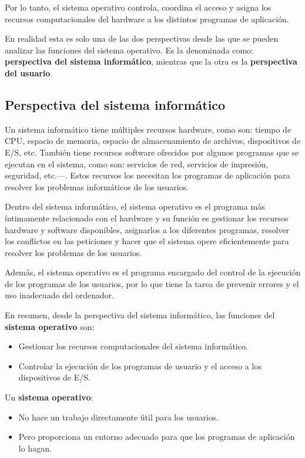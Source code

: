 Por lo tanto, el sistema operativo controla, coordina el acceso y asigna
los recursos computacionales del hardware a los distintos programas de
aplicación.

En realidad esta es solo una de las dos perspectivas desde las que se
pueden analizar las funciones del sistema operativo. Es la denominada
como: \textbf{perspectiva del sistema informático}, mientras que la otra
es la \textbf{perspectiva del usuario}.

\subsection{Perspectiva del sistema
informático}\label{_perspectiva_del_sistema_informuxe1tico}

Un sistema informático tiene múltiples recursos hardware, como son:
tiempo de CPU, espacio de memoria, espacio de almacenamiento de
archivos, dispositivos de E/S, etc. También tiene recursos software
ofrecidos por algunos programas que se ejecutan en el sistema, como son:
servicios de red, servicios de impresión, seguridad, etc.---. Estos
recursos los necesitan los programas de aplicación para resolver los
problemas informáticos de los usuarios.

Dentro del sistema informático, el sistema operativo es el programa más
íntimamente relacionado con el hardware y su función es gestionar los
recursos hardware y software disponibles, asignarlos a los diferentes
programas, resolver los conflictos en las peticiones y hacer que el
sistema opere eficientemente para resolver los problemas de los
usuarios.

Además, el sistema operativo es el programa encargado del control de la
ejecución de los programas de los usuarios, por lo que tiene la tarea de
prevenir errores y el uso inadecuado del ordenador.

En resumen, desde la perspectiva del sistema informático, las funciones
del \textbf{{}sistema operativo} son:

\begin{itemize}
\item
  Gestionar los recursos computacionales del sistema informático.
\item
  Controlar la ejecución de los programas de usuario y el acceso a los
  dispositivos de E/S.
\end{itemize}

Un \textbf{sistema operativo}:

\begin{itemize}
\item
  No hace un trabajo directamente útil para los usuarios.
\item
  Pero proporciona un entorno adecuado para que los programas de
  aplicación lo hagan.
\end{itemize}

